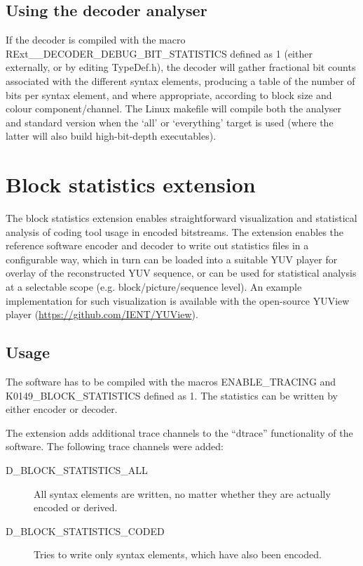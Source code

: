 ﻿\documentclass[a4paper,11pt]{jvetdoc}
\begin{document}
\subsection{Using the decoder analyser}
If the decoder is compiled with the macro RExt__DECODER_DEBUG_BIT_STATISTICS defined as 1 (either externally, or by editing TypeDef.h), the decoder will gather fractional bit counts associated with the different syntax elements, producing a table of the number of bits per syntax element, and where appropriate, according to block size and colour component/channel.
The Linux makefile will compile both the analyser and standard version when the `all' or `everything' target is used (where the latter will also build  high-bit-depth executables).



\section{Block statistics extension}
\label{sec:block-stat-extens}

The block statistics extension enables straightforward visualization and statistical analysis of coding tool
usage in encoded bitstreams. The extension enables the reference
software encoder and decoder to write out statistics files in a configurable
way, which in turn can be loaded into a suitable YUV player for overlay of the
reconstructed YUV sequence, or can be used for statistical analysis at a
selectable scope (e.g. block/picture/sequence level). An example implementation
for such visualization is available with the open-source YUView player
(\url{https://github.com/IENT/YUView}). 


\subsection{Usage}
\label{sec:usage}

The software has to be compiled with the macros ENABLE_TRACING and
K0149_BLOCK_STATISTICS  defined as 1. The statistics can be written by either
encoder or decoder.

The extension adds additional trace channels to the ``dtrace'' functionality of
the software. The following trace channels were added:
\begin{description}
\item[D_BLOCK_STATISTICS_ALL] All syntax elements are written, no matter whether
  they are actually encoded or derived.
\item[D_BLOCK_STATISTICS_CODED] Tries to write only syntax elements, which have
  also been encoded.
\end{description}
\end{document}
